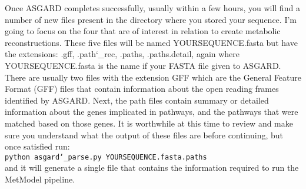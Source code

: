 \indent Once ASGARD completes successfully, usually within a few hours, you will find a number of new files present in the directory where you stored your sequence. I'm going to focus on the four that are of interest in relation to create metabolic reconstructions. These five files will be named YOURSEQUENCE.fasta but have the extensions: .gff, .path\char`_rec, .paths, .paths.detail, again where YOURSEQUENCE.fasta is the name if your FASTA file given to ASGARD.  There are usually two files with the extension GFF which are the General Feature Format (GFF) files that contain information about the open reading frames identified by ASGARD. Next, the path files contain summary or detailed information about the genes implicated in pathways, and the pathways that were matched based on those genes. It is worthwhile at this time to review and make sure you understand what the output of these files are before continuing, but once satisfied run:\\ \texttt{python asgard\char`_parse.py YOURSEQUENCE.fasta.paths} \\ and it will generate a single file that contains the information required to run the MetModel pipeline.

